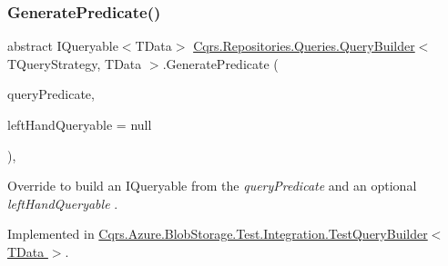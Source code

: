 \subsubsection{\texorpdfstring{Generate\+Predicate()}{GeneratePredicate()}\hspace{0.1cm}{\footnotesize\ttfamily [2/2]}}
{\footnotesize\ttfamily abstract I\+Queryable$<$T\+Data$>$ \hyperlink{classCqrs_1_1Repositories_1_1Queries_1_1QueryBuilder}{Cqrs.\+Repositories.\+Queries.\+Query\+Builder}$<$ T\+Query\+Strategy, T\+Data $>$.Generate\+Predicate (\begin{DoxyParamCaption}\item[{\hyperlink{classCqrs_1_1Repositories_1_1Queries_1_1QueryPredicate}{Query\+Predicate}}]{query\+Predicate,  }\item[{I\+Queryable$<$ T\+Data $>$}]{left\+Hand\+Queryable = {\ttfamily null} }\end{DoxyParamCaption})\hspace{0.3cm}{\ttfamily [protected]}, {}}



Override to build an I\+Queryable from the {\itshape query\+Predicate}  and an optional {\itshape left\+Hand\+Queryable} . 



Implemented in \hyperlink{classCqrs_1_1Azure_1_1BlobStorage_1_1Test_1_1Integration_1_1TestQueryBuilder_a33024ff6952fe0dbc51409e23c217ece_a33024ff6952fe0dbc51409e23c217ece}{Cqrs.\+Azure.\+Blob\+Storage.\+Test.\+Integration.\+Test\+Query\+Builder$<$ T\+Data $>$}.

\mbox{\label{classCqrs_1_1Repositories_1_1Queries_1_1QueryBuilder_a9a6596d3dd0e4489bfa2d5d93ac93ec8_a9a6596d3dd0e4489bfa2d5d93ac93ec8}} 

